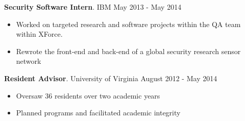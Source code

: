 \documentclass[margin]{res}
\begin{document}
\begin{resume}
{\textbf{Security Software Intern}. IBM} \hfill May 2013 - May 2014
\begin{itemize} \itemsep -2pt
	\item Worked on targeted research and software projects within the QA team within XForce. 
	\item Rewrote the front-end and back-end of a global security research sensor network
\end{itemize}

{\textbf{Resident Advisor}. University of Virginia} \hfill August 2012 - May 2014
\begin{itemize} \itemsep -2pt
	\item Oversaw 36 residents over two academic years
	\item Planned programs and facilitated academic integrity
\end{itemize}


\end{resume}
\end{document}
